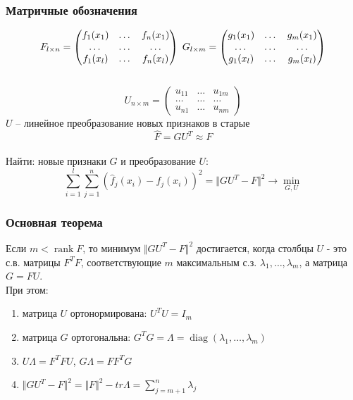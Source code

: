 \documentclass[12pt]{beamer}
\DeclareMathOperator{\rank}{rank}
\begin{document}
\begin{frame}\frametitle{Матричные обозначения}
$$F_{l \times n} = \begin{pmatrix}
  f_1(x_1) & \dots & f_n(x_1) \\
  \dots & \dots & \dots\\
  f_1(x_l) & \dots & f_n(x_l)
 \end{pmatrix} \hspace{1mm} G_{l \times m} = \begin{pmatrix}
  g_1(x_1) & \dots & g_m(x_1) \\
  \dots & \dots & \dots\\
  g_1(x_l) & \dots & g_m(x_l)
 \end{pmatrix}$$\\
 $$U_{n \times m} = \begin{pmatrix}
  u_{11} & \dots & u_{1m} \\
  \dots & \dots & \dots\\
  u_{n1} & \dots & u_{nm}
 \end{pmatrix}$$
$U$ -- линейное преобразование новых признаков в старые\\
$$\hat{F} = GU^T \approx F$$\\
Найти: новые признаки $G$ и преобразование $U$:\\
$$\sum\limits_{i=1}^l \sum\limits_{j=1}^n (\hat{f}_j(x_i) - f_j(x_i))^2 = \Vert GU^T - F \Vert^2 \rightarrow \min\limits_{G, U}$$
\end{frame}

\begin{frame}\frametitle{Основная теорема}
Если $m < \rank F$, то минимум $\Vert GU^T - F \Vert^2$ достигается, когда столбцы $U$ - это с.в. матрицы $F^TF$, соответствующие $m$ максимальным с.з. $\lambda_1,\dots, \lambda_m$, а матрица $G = FU$.\\
\vspace{5mm}
При этом:\\
\begin{enumerate}[--]
\item матрица $U$ ортонормирована: $U^TU = I_m$
\item матрица $G$ ортогональна: $G^TG = \Lambda = \operatorname{diag}(\lambda_1, \dots, \lambda_m)$
\item $U\Lambda = F^TFU$,  $G\Lambda = FF^TG$
\item $\Vert GU^T - F \Vert^2 = \Vert F \Vert^2 - tr \Lambda = \sum\limits_{j=m+1}^n \lambda_j$
\end{enumerate}

\end{frame}
\end{document}
